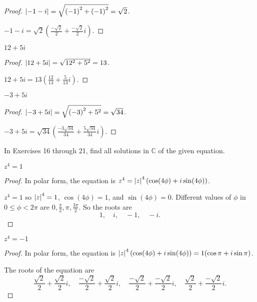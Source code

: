 \begin{proof}
    $\left\vert{-1 - i}\right\vert = \sqrt{{(-1)}^{2} + {(-1)}^{2}} = \sqrt{2}$.

    $-1 - i = \sqrt{2}\left(\frac{-\sqrt{2}}{2} + \frac{-\sqrt{2}}{2}i\right)$.
\end{proof}

\begin{exercise}
    $12 + 5i$
\end{exercise}

\begin{proof}
    $\left\vert{12 + 5i}\right\vert = \sqrt{12^{2} + 5^{2}} = 13$.

    $12 + 5i = 13\left( \frac{12}{13} + \frac{5}{13}i \right)$.
\end{proof}

\begin{exercise}
    $-3 + 5i$
\end{exercise}

\begin{proof}
    $\left\vert{-3 + 5i}\right\vert = \sqrt{{(-3)}^{2} + 5^{2}} = \sqrt{34}$.

    $-3 + 5i = \sqrt{34}\left( \frac{-3\sqrt{34}}{34} + \frac{5\sqrt{34}}{34}i \right)$.
\end{proof}

In Exercises 16 through 21, find all solutions in $\mathbb{C}$ of the given equation.

\begin{exercise}
    $z^{4} = 1$
\end{exercise}

\begin{proof}
    In polar form, the equation is $z^{4} = \left\vert{z}\right\vert^{4}(\cos (4\phi) + i\sin (4\phi))$.

    $z^{4} = 1$ so $\left\vert{z}\right\vert^{4} = 1$, $\cos(4\phi) = 1$, and $\sin(4\phi) = 0$. Different values of $\phi$ in $0\le \phi < 2\pi$ are $0, \frac{\pi}{2}, \pi, \frac{3\pi}{2}$. So the roots are
    \[
        1,\quad i,\quad -1,\quad -i.
    \]
\end{proof}

\begin{exercise}
    $z^{4} = -1$
\end{exercise}

\begin{proof}
    In polar form, the equation is $\left\vert{z}\right\vert^{4}(\cos (4\phi) + i\sin (4\phi)) = 1(\cos\pi + i\sin\pi)$.

    The roots of the equation are
    \[
        \frac{\sqrt{2}}{2} + \frac{\sqrt{2}}{2}i,\quad \frac{-\sqrt{2}}{2} + \frac{\sqrt{2}}{2}i,\quad \frac{-\sqrt{2}}{2} + \frac{-\sqrt{2}}{2}i,\quad \frac{\sqrt{2}}{2} + \frac{-\sqrt{2}}{2}i.
    \]
\end{proof}

